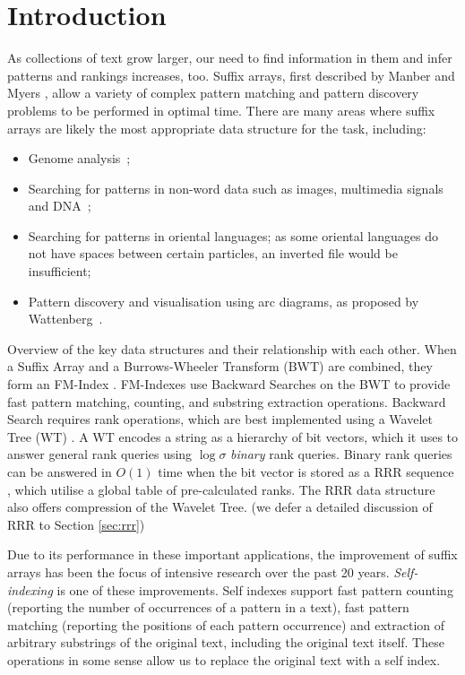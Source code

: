 \section{Introduction}

As collections of text grow larger, our need to find information in them
and infer patterns and rankings increases, too. Suffix arrays, first
described by Manber and Myers \cite{manber1993}, allow a variety of complex 
pattern matching and pattern discovery problems to be performed in optimal time. 
There are many areas where suffix arrays are likely the most appropriate data 
structure for the task, including:

\begin{itemize}
	\item
		Genome analysis~\cite{abouelhoda2004, flicek2009};
	\item
		Searching for patterns in non-word data such as images, multimedia 
		signals and DNA~\cite{culpepper2010};
	\item
		Searching for patterns in oriental languages; as some oriental languages
    	do not have spaces between certain particles, an inverted file would be
    	insufficient;
	\item
		Pattern discovery and visualisation using arc diagrams, as proposed by
    	Wattenberg~\cite{wattenberg2002}.
\end{itemize}

	{Overview of the key data structures and their relationship
	with each other. When a Suffix Array and a Burrows-Wheeler 
	Transform (BWT) \cite{burrows1994} are combined, they form an FM-Index 
	\cite{ferragina2000}. FM-Indexes use 
	Backward Searches on the BWT to provide fast pattern 
	matching, counting, and substring extraction operations. Backward
	Search requires rank operations, which are best implemented using
	a Wavelet Tree (WT) \cite{grossi2003}. A WT encodes a string as a hierarchy 
	of bit vectors, 
	which it uses to answer general rank queries using $\log \sigma$ 
	\emph{binary} rank 
	queries. Binary rank queries can be answered in $O(1)$ time when the bit 
	vector is stored as a RRR sequence \cite{raman2007}, which utilise a global 
	table of pre-calculated ranks. The RRR data structure also offers 
	compression of the Wavelet Tree. (we defer a detailed discussion of RRR to
	Section \ref{sec:rrr})}

Due to its performance in these important applications, the improvement of 
suffix arrays has been the focus of intensive research over the past 20 years. 
\emph{Self-indexing} is one of these improvements. Self indexes support 
fast pattern counting (reporting the number of occurrences of a pattern in a 
text), fast pattern matching (reporting the positions of each pattern 
occurrence) and extraction of arbitrary 
substrings of the original text, including the original text itself. These 
operations in some sense allow us to replace the original text with a self 
index.

